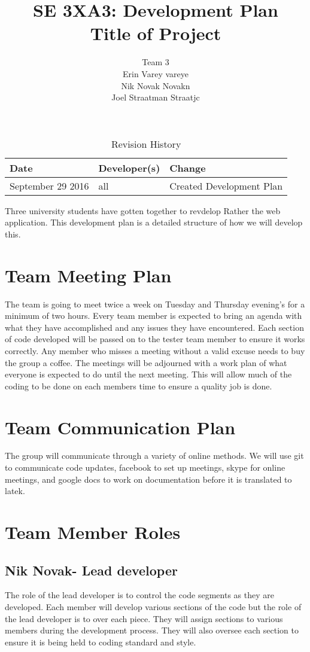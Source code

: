 \documentclass{article}
\title{SE 3XA3: Development Plan\\Title of Project}
\author{Team 3
		\\ Erin Varey vareye
		\\ Nik Novak Novakn
		\\ Joel Straatman Straatjc
}
\date{}
\begin{document}
\begin{table}[hp]
\caption{Revision History} \label{TblRevisionHistory}
\begin{tabularx}{\textwidth}{llX}
\toprule
\textbf{Date} & \textbf{Developer(s)} & \textbf{Change}\\
\midrule
September 29 2016 & all & Created Development Plan\\

\bottomrule
\end{tabularx}
\end{table}
\newpage
\maketitle
Three university students have gotten together to revdelop Rather the web application. 
This development plan is a detailed structure of how we will develop this.
\section{Team Meeting Plan}
The team is going to meet twice a week on Tuesday and Thursday evening's for a minimum of two hours. Every team member is expected to bring an agenda with what they have accomplished and any issues they have encountered. Each section of code developed will be passed on to the tester team member to ensure it works correctly. Any member who misses a meeting without a valid excuse needs to buy the group a coffee. The meetings will be adjourned with a work plan of what everyone is expected to do until the next meeting. This will allow much of the coding to be done on each members time to ensure a quality job is done. 
\section{Team Communication Plan}
The group will communicate through a variety of online methods. We will use git to communicate code updates, facebook to set up meetings, skype for online meetings, and google docs to work on documentation before it is translated to latek.
\section{Team Member Roles}
\subsection{Nik Novak- Lead developer}
The role of the lead developer is to control the code segments as they are developed. Each member will develop various sections of the code but the role of the lead developer is to over each piece. They will assign sections to various members during the development process. They will also oversee each section to ensure it is being held to coding standard and style. 
\end{document}
